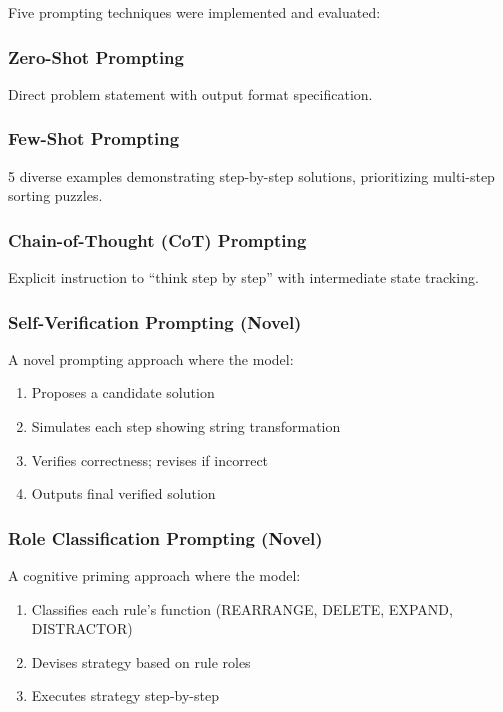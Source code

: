 \documentclass[11pt,a4paper]{article}
\begin{document}
Five prompting techniques were implemented and evaluated:

\subsubsection{Zero-Shot Prompting}
Direct problem statement with output format specification.

\subsubsection{Few-Shot Prompting}
5 diverse examples demonstrating step-by-step solutions, prioritizing multi-step sorting puzzles.

\subsubsection{Chain-of-Thought (CoT) Prompting}
Explicit instruction to ``think step by step'' with intermediate state tracking.

\subsubsection{Self-Verification Prompting (Novel)}
\begin{tcolorbox}[colback=green!5,colframe=green!50!black]
A novel prompting approach where the model:
\begin{enumerate}
    \item Proposes a candidate solution
    \item Simulates each step showing string transformation
    \item Verifies correctness; revises if incorrect
    \item Outputs final verified solution
\end{enumerate}
\end{tcolorbox}

\subsubsection{Role Classification Prompting (Novel)}
\begin{tcolorbox}[colback=purple!5,colframe=purple!50!black]
A cognitive priming approach where the model:
\begin{enumerate}
    \item Classifies each rule's function (REARRANGE, DELETE, EXPAND, DISTRACTOR)
    \item Devises strategy based on rule roles
    \item Executes strategy step-by-step
\end{enumerate}
\end{tcolorbox}
\end{document}
